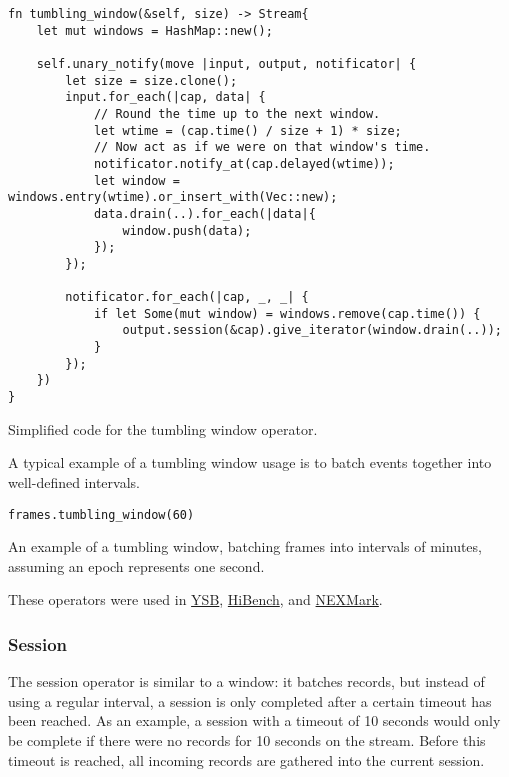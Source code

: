 \begin{listing}[H]
\begin{verbatim}
fn tumbling_window(&self, size) -> Stream{
    let mut windows = HashMap::new();
    
    self.unary_notify(move |input, output, notificator| {
        let size = size.clone();
        input.for_each(|cap, data| {
            // Round the time up to the next window.
            let wtime = (cap.time() / size + 1) * size;
            // Now act as if we were on that window's time.
            notificator.notify_at(cap.delayed(wtime));
            let window = windows.entry(wtime).or_insert_with(Vec::new);
            data.drain(..).for_each(|data|{
                window.push(data);
            });
        });
        
        notificator.for_each(|cap, _, _| {
            if let Some(mut window) = windows.remove(cap.time()) {
                output.session(&cap).give_iterator(window.drain(..));
            }
        });
    })
}
\end{verbatim}
  \caption{Simplified code for the tumbling window operator.}
  \label{lst:tumbling-window}
\end{listing}

A typical example of a tumbling window usage is to batch events together into well-defined intervals.

\begin{listing}[H]
\begin{verbatim}
frames.tumbling_window(60)
\end{verbatim}
\caption{An example of a tumbling window, batching frames into intervals of minutes, assuming an epoch represents one second.}
\label{lst:tumbling-window-example}
\end{listing}

\noindent These operators were used in \hyperref[section:ysb]{YSB}, \hyperref[section:hibench]{HiBench}, and \hyperref[section:nexmark]{NEXMark}.

\subsubsection{Session}
The session operator is similar to a window: it batches records, but instead of using a regular interval, a session is only completed after a certain timeout has been reached. As an example, a session with a timeout of 10 seconds would only be complete if there were no records for 10 seconds on the stream. Before this timeout is reached, all incoming records are gathered into the current session.

